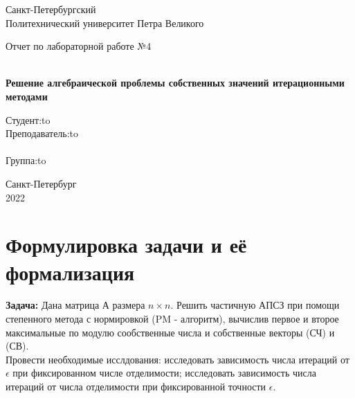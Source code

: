 \documentclass[12pt]{article}
\begin{document}
\begin{titlepage}
\Large

\begin{center}
Санкт-Петербургский \\ Политехнический университет Петра Великого

\vspace{10em}

Отчет по лабораторной работе №4\\
\\

\vspace{2em}

\textbf{Решение алгебраической проблемы собственных значений итерационными
методами}
\end{center}

\vspace{6em}

\newbox{\lbox}
\newlength{\maxl}
\setlength{\maxl}{\wd\lbox}
\hfill\parbox{14cm}{
\hspace*{5cm}\hspace*{-5cm}Студент:\hfill\hbox to\\
\hspace*{5cm}\hspace*{-5cm}Преподаватель:\hfill\hbox to\\
\\
\hspace*{5cm}\hspace*{-5cm}Группа:\hfill\hbox to\\}

\vspace{\fill}
\begin{center}
Санкт-Петербург \\2022
\end{center}
\end{titlepage}
\section{Формулировка задачи и её формализация}
\textbf{Задача:}
Дана матрица А размера $n\times n$. Решить частичную АПСЗ при помощи степенного метода с нормировкой (PM - алгоритм), вычислив первое и второе максимальные по модулю сообственные числа и собственные векторы (СЧ) и (СВ). \\
Провести необходимые исслдования: исследовать зависимость числа итераций от $\epsilon$ при фиксированном числе отделимости; исследовать зависимость числа итераций от числа отделимости при фиксированной точности $\epsilon.$
\end{document}
